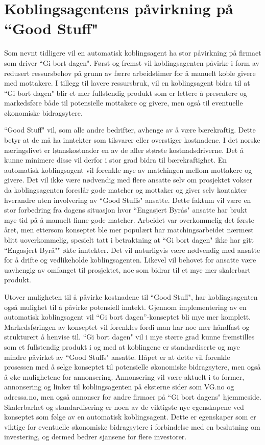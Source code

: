 \section{Koblingsagentens påvirkning på ``Good Stuff"}
\label{sec:koblingsagent}
Som nevnt tidligere vil en automatisk koblingsagent ha stor påvirkning på firmaet som driver ``Gi bort dagen". Først og fremst vil koblingsagenten påvirke i form av redusert ressursbehov på grunn av færre arbeidstimer for å manuelt koble givere med mottakere. I tillegg til lavere ressursbruk, vil en koblingsagent bidra til at ``Gi bort dagen" blir et mer fullstendig produkt som er lettere å presentere og markedsføre både til potensielle mottakere og givere, men også til eventuelle økonomiske bidragsytere.

``Good Stuff" vil, som alle andre bedrifter, avhenge av å være bærekraftig. Dette betyr at de må ha inntekter som tilsvarer eller overstiger kostnadene. I det norske næringslivet er lønnskostnader en av de aller største kostnadsdriverne. Det å kunne minimere disse vil derfor i stor grad bidra til bærekraftighet. En automatisk koblingsagent vil forenkle mye av matchingen mellom mottakere og givere. Det vil ikke være nødvendig med flere ansatte selv om prosjektet vokser da koblingsagenten foreslår gode matcher og mottaker og giver selv kontakter hverandre uten involvering av ``Good Stuffs" ansatte. Dette faktum vil være en stor forbedring fra dagens situasjon hvor ``Engasjert Byrås" ansatte har brukt mye tid på å manuelt finne gode matcher. Arbeidet var overkommelig det første året, men ettersom konseptet ble mer populært har matchingsarbeidet nærmest blitt uoverkommelig, spesielt tatt i betraktning at ``Gi bort dagen" ikke har gitt ``Engasjert Byrå"" økte inntekter. Det vil naturligvis være nødvendig med ansatte for å drifte og vedlikeholde koblingsagenten. Likevel vil behovet for ansatte være uavhengig av omfanget til prosjektet, noe som bidrar til et mye mer skalerbart produkt.

Utover muligheten til å påvirke kostnadene til ``Good Stuff", har koblingsagenten også mulighet til å påvirke potensiell inntekt. Gjennom implementering av en automatisk koblingsagent vil “Gi bort dagen”-konseptet bli mye mer komplett. Markedsføringen av konseptet vil forenkles fordi man har noe mer håndfast og strukturert å henvise til. ``Gi bort dagen" vil i mye større grad kunne fremstilles som et fullstendig produkt i og med at koblingene er standardiserte og mye mindre påvirket av ``Good Stuffs" ansatte. Håpet er at dette vil forenkle prosessen med å selge konseptet til potensielle økonomiske bidragsytere, men også å øke mulighetene for annonsering. Annonsering vil være aktuelt i to former, annonsering og linker til koblingsagenten på eksterne sider som VG.no og adressa.no, men også annonser for andre firmaer på ``Gi bort dagens" hjemmeside. Skalerbarhet og standardisering er noen av de viktigste nye egenskapene ved konseptet som følge av en automatisk koblingsagent. Dette er egenskaper som er viktige for eventuelle økonomiske bidragsytere i forbindelse med en beslutning om investering, og dermed bedrer sjansene for flere investorer.

